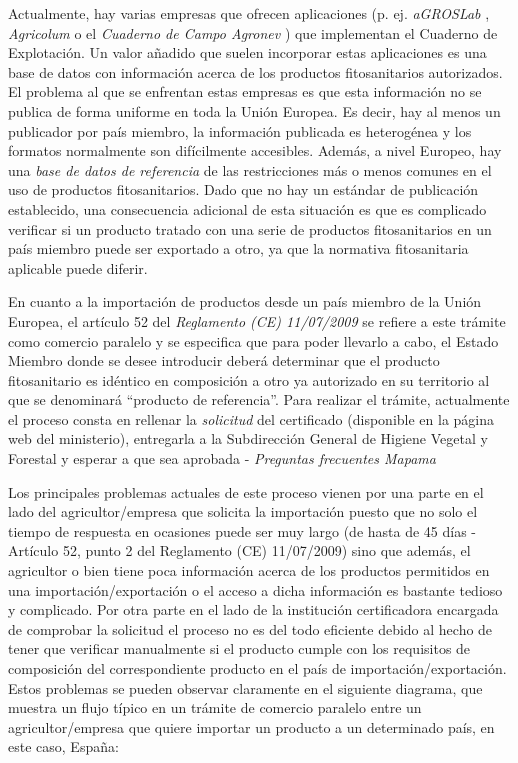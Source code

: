 Actualmente, hay varias empresas que ofrecen aplicaciones (p. ej. \textit{aGROSLab} \cite{agroslab}, \textit{Agricolum} \cite{agricolum} o el \textit{Cuaderno de Campo Agronev} \cite{agronev}) que implementan el Cuaderno de Explotación. Un valor añadido que suelen incorporar estas aplicaciones es una base de datos con información acerca de los productos fitosanitarios autorizados. El problema al que se enfrentan estas empresas es que esta información no se publica de forma uniforme en toda la Unión Europea. Es decir, hay al menos un publicador por país miembro, la información publicada es heterogénea y los formatos normalmente son difícilmente accesibles. Además, a nivel Europeo, hay una \textit{base de datos de referencia} \cite{pesticidesdb} de las restricciones más o menos comunes en el uso de productos fitosanitarios. Dado que no hay un estándar de publicación establecido, una consecuencia adicional de esta situación es que es complicado verificar si un producto tratado con una serie de productos fitosanitarios en un país miembro puede ser exportado a otro, ya que la normativa fitosanitaria aplicable puede diferir.\par
En cuanto a la importación de productos desde un país miembro de la Unión Europea, el artículo 52 del \textit{Reglamento (CE) 11/07/2009} \cite{reglamento} se refiere a este trámite como comercio paralelo y se especifica que para poder llevarlo a cabo, el Estado Miembro donde se desee introducir deberá determinar que el producto fitosanitario es idéntico en composición a otro ya autorizado en su territorio al que se denominará “producto de referencia”. Para realizar el trámite, actualmente el proceso consta en rellenar la \textit{solicitud} del \gls{certificado} \cite{solicitud} (disponible en la página web del ministerio), entregarla a la Subdirección General de Higiene Vegetal y Forestal y esperar a que sea aprobada - \textit{Preguntas frecuentes Mapama} \cite{faqmapama} \par
Los principales problemas actuales de este proceso vienen por una parte en el lado del agricultor/empresa que solicita la importación puesto que no solo el tiempo de respuesta en ocasiones puede ser muy largo (de hasta de 45 días - Artículo 52, punto 2 del Reglamento (CE) 11/07/2009) sino que además, el agricultor o bien tiene poca información acerca de los productos permitidos en una importación/exportación o el acceso a dicha información es bastante tedioso y complicado. Por otra parte en el lado de la institución certificadora encargada de comprobar la solicitud el proceso no es del todo eficiente debido al hecho de tener que verificar manualmente si el producto cumple con los requisitos de composición del correspondiente producto en el país de importación/exportación. Estos problemas se pueden observar claramente en el siguiente diagrama, que muestra un flujo típico en un trámite de comercio paralelo entre un agricultor/empresa que quiere importar un producto a un determinado país, en este caso, España: 

